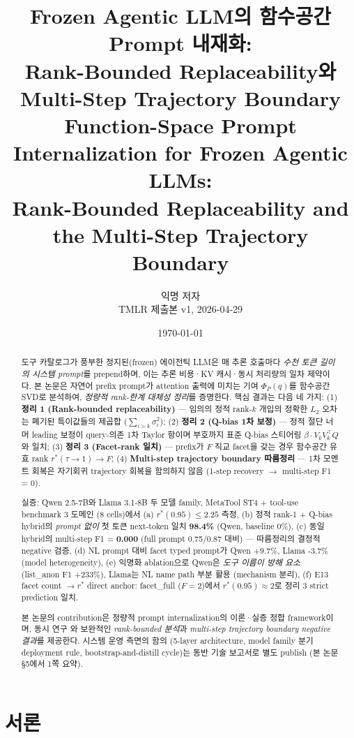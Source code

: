 \documentclass[11pt]{article}
\title{
  Frozen Agentic LLM의 함수공간 Prompt 내재화:\\
  Rank-Bounded Replaceability와 Multi-Step Trajectory Boundary\\[4pt]
  \large Function-Space Prompt Internalization for Frozen Agentic LLMs:\\
  Rank-Bounded Replaceability and the Multi-Step Trajectory Boundary
}
\author{
  익명 저자\\
  TMLR 제출본 v1, 2026-04-29
}
\date{\today}
\theoremstyle{definition}
\newcommand{\Phip}{\Phi_P}
\begin{document}
\maketitle

\begin{abstract}
\noindent
도구 카탈로그가 풍부한 정지된(frozen) 에이전틱 LLM은 매 추론 호출마다 \emph{수천 토큰 길이의 시스템 prompt}를 prepend하며, 이는 추론 비용·KV 캐시·동시 처리량의 일차 제약이다. 본 논문은 자연어 prefix prompt가 attention 출력에 미치는 기여 $\Phip(q)$를 함수공간 SVD로 분석하여, \emph{정량적 rank-한계 대체성 정리}를 증명한다. 핵심 결과는 다음 네 가지: (1) \textbf{정리 1 (Rank-bounded replaceability)} --- 임의의 정적 rank-$k$ 개입의 정확한 $L_2$ 오차는 폐기된 특이값들의 제곱합 ($\sum_{i>k}\sigma_i^2$); (2) \textbf{정리 2 (Q-bias 1차 보정)} --- 정적 절단 너머 leading 보정이 query-의존 1차 Taylor 항이며 부호까지 표준 Q-bias 스티어링 $\beta\cdot V_k V_k^\top Q$와 일치; (3) \textbf{정리 3 (Facet-rank 일치)} --- prefix가 $F$ 직교 facet을 갖는 경우 함수공간 유효 rank $r^*(\tau \to 1) \to F$; (4) \textbf{Multi-step trajectory boundary 따름정리} --- 1차 모멘트 회복은 자기회귀 trajectory 회복을 함의하지 않음 (1-step recovery $\to$ multi-step F1 = 0).

실증: Qwen 2.5-7B와 Llama 3.1-8B 두 모델 family, MetaTool ST4 + tool-use benchmark 3 도메인 (8 cells)에서 (a) $r^*(0.95) \le 2.25$ 측정, (b) 정적 rank-1 + Q-bias hybrid의 \emph{prompt 없이} 첫 토큰 next-token 일치 \textbf{98.4\%} (Qwen, baseline 0\%), (c) 동일 hybrid의 multi-step F1 = \textbf{0.000} (full prompt 0.75/0.87 대비) --- 따름정리의 결정적 negative 검증, (d) NL prompt 대비 facet typed prompt가 Qwen +9.7\%, Llama -3.7\% (model heterogeneity), (e) 익명화 ablation으로 Qwen은 \emph{도구 이름이 방해 요소} (list\_anon F1 +233\%), Llama는 NL name path 부분 활용 (mechanism 분리), (f) E13 facet count $\to r^*$ direct anchor: facet\_full ($F=2$)에서 $r^*(0.95) \approx 2$로 정리 3 strict prediction 일치.

본 논문의 contribution은 정량적 prompt internalization의 이론·실증 정합 framework이며, 동시 연구 \citep{belitsky2025kvsteer, shin2025genpi}와 보완적인 \emph{rank-bounded 분석}과 \emph{multi-step trajectory boundary negative 결과}를 제공한다. 시스템 운영 측면의 함의 (5-layer architecture, model family 분기 deployment rule, bootstrap-and-distill cycle)는 동반 기술 보고서로 별도 publish (본 논문 §5에서 1쪽 요약).
\end{abstract}

\section{서론}
\label{sec:intro}
\end{document}
